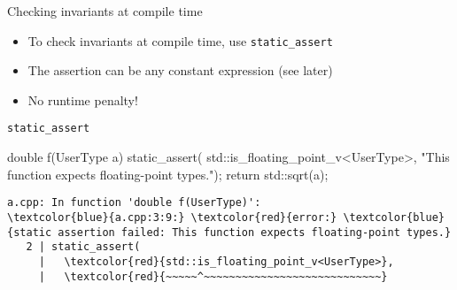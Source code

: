 \begin{frame}[fragile]
  \begin{block}{Checking invariants at compile time}
    \begin{itemize}
      \item To check invariants at compile time, use \texttt{static_assert}
      \item The assertion can be any constant expression (see later)
      \item No runtime penalty!
    \end{itemize}
  \end{block}
  \begin{exampleblock}{\texttt{static\_assert}}
    \small
    \begin{cppcode*}{}
      double f(UserType a) {
        static_assert(
          std::is_floating_point_v<UserType>,
          "This function expects floating-point types.");
        return std::sqrt(a);
      }
    \end{cppcode*}
  \end{exampleblock}
  \scriptsize
  \begin{Verbatim}[commandchars=\\\{\}]
a.cpp: In function 'double f(UserType)':
\textcolor{blue}{a.cpp:3:9:} \textcolor{red}{error:} \textcolor{blue}{static assertion failed: This function expects floating-point types.}
   2 | static_assert(
     |   \textcolor{red}{std::is_floating_point_v<UserType>},
     |   \textcolor{red}{~~~~~^~~~~~~~~~~~~~~~~~~~~~~~~~~~~}
  \end{Verbatim}
\end{frame}
